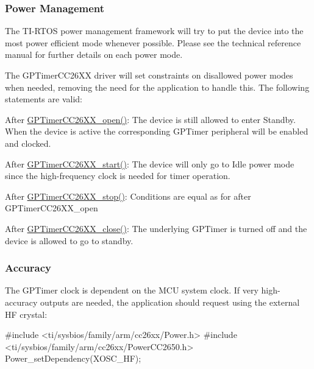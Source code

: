 \subsubsection*{Power Management}

The T\+I-\/\+R\+T\+O\+S power management framework will try to put the device into the most power efficient mode whenever possible. Please see the technical reference manual for further details on each power mode.

The G\+P\+Timer\+C\+C26\+X\+X driver will set constraints on disallowed power modes when needed, removing the need for the application to handle this. The following statements are valid\+:
\begin{DoxyItemize}
\item After \hyperlink{_g_p_timer_c_c26_x_x_8h_a30f6c028f0abea0b35c3be3d1609ea9b}{G\+P\+Timer\+C\+C26\+X\+X\+\_\+open()}\+: The device is still allowed to enter Standby. When the device is active the corresponding G\+P\+Timer peripheral will be enabled and clocked.
\item After \hyperlink{_g_p_timer_c_c26_x_x_8h_a869213ede8949245112fd7ca9c9ebdaa}{G\+P\+Timer\+C\+C26\+X\+X\+\_\+start()}\+: The device will only go to Idle power mode since the high-\/frequency clock is needed for timer operation.
\item After \hyperlink{_g_p_timer_c_c26_x_x_8h_aebdbd7f83c3824555e4abb7399802765}{G\+P\+Timer\+C\+C26\+X\+X\+\_\+stop()}\+: Conditions are equal as for after G\+P\+Timer\+C\+C26\+X\+X\+\_\+open
\item After \hyperlink{_g_p_timer_c_c26_x_x_8h_a0a148f2232f5bb4c59015de965c82d43}{G\+P\+Timer\+C\+C26\+X\+X\+\_\+close()}\+: The underlying G\+P\+Timer is turned off and the device is allowed to go to standby.
\end{DoxyItemize}

\subsubsection*{Accuracy}

The G\+P\+Timer clock is dependent on the M\+C\+U system clock. If very high-\/accuracy outputs are needed, the application should request using the external H\+F crystal\+: 
\begin{DoxyCode}
\textcolor{preprocessor}{#include <ti/sysbios/family/arm/cc26xx/Power.h>}
\textcolor{preprocessor}{#include <ti/sysbios/family/arm/cc26xx/PowerCC2650.h>}
Power_setDependency(XOSC\_HF);
\end{DoxyCode}


